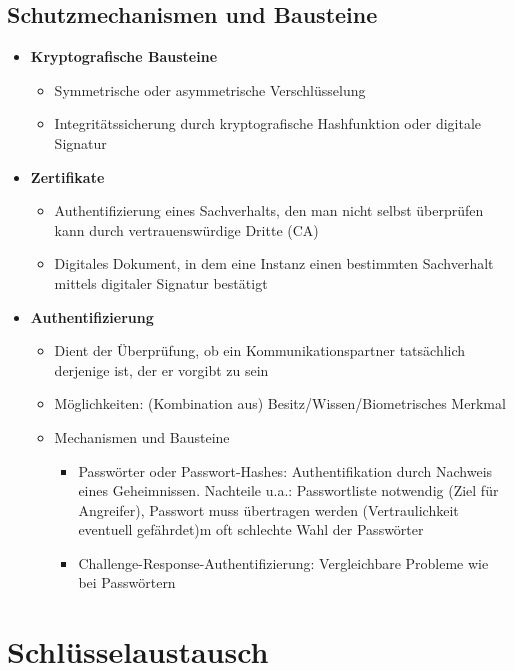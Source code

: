 \subsection{Schutzmechanismen und Bausteine}
\begin{itemize}
	\item \textbf{Kryptografische Bausteine}
	\begin{itemize}
		\item Symmetrische oder asymmetrische Verschlüsselung
		\item Integritätssicherung durch kryptografische Hashfunktion oder digitale Signatur
	\end{itemize}
	\item \textbf{Zertifikate}
	\begin{itemize}
		\item Authentifizierung eines Sachverhalts, den man nicht selbst überprüfen kann durch vertrauenswürdige Dritte (CA)
		\item Digitales Dokument, in dem eine Instanz einen bestimmten Sachverhalt mittels digitaler Signatur bestätigt
	\end{itemize}
	\item \textbf{Authentifizierung}
	\begin{itemize}
		\item Dient der Überprüfung, ob ein Kommunikationspartner tatsächlich derjenige ist, der er vorgibt zu sein
		\item Möglichkeiten: (Kombination aus) Besitz/Wissen/Biometrisches Merkmal
		\item Mechanismen und Bausteine
		\begin{itemize}
			\item Passwörter oder Passwort-Hashes: Authentifikation durch Nachweis eines Geheimnissen. Nachteile u.a.: Passwortliste notwendig (Ziel für Angreifer), Passwort muss übertragen werden (Vertraulichkeit eventuell gefährdet)m oft schlechte Wahl der Passwörter
			\item Challenge-Response-Authentifizierung: Vergleichbare Probleme wie bei Passwörtern
		\end{itemize}
	\end{itemize}
\end{itemize}



\section{Schlüsselaustausch}




